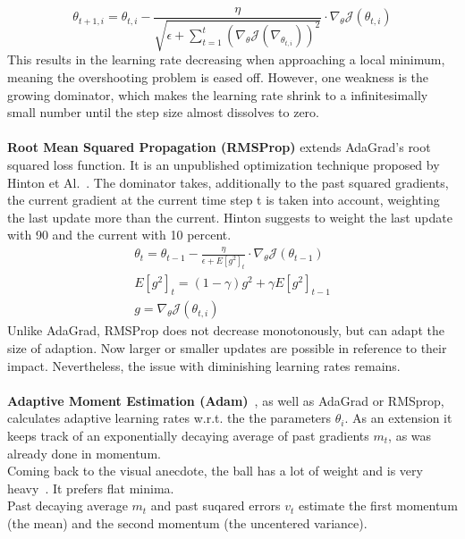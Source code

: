 \begin{equation}
    \theta_{t+1,i} = \theta_{t,i} - \frac{\eta}{\sqrt{\epsilon+\sum_{t=1}^{t}(\nabla_\theta\mathcal{J}(\nabla_{\theta_{t,i}}))^2}} \cdot \nabla_\theta\mathcal{J}(\theta_{t,i})
    \label{eqn:adagrad}
\end{equation}
This results in the learning rate decreasing when approaching a local minimum, meaning the overshooting problem is eased off.
However, one weakness is the growing dominator, which makes the learning rate shrink to a infinitesimally small number until the step
size almost dissolves to zero.
\\\mbox{}\\
\textbf{Root Mean Squared Propagation (RMSProp)} extends AdaGrad's root squared loss function.
It is an unpublished optimization technique proposed by Hinton et Al.~\cite{rmsprop}.
The dominator takes, additionally to the past squared gradients, the current gradient at the current time step t is
taken into account, weighting the last update more than the current.
Hinton suggests to weight the last update with 90 and the current with 10 percent.
\begin{align}
    \theta_{t} = \theta_{t-1} - \frac{\eta}{\epsilon+E[g^2]_t} \cdot \nabla_\theta\mathcal{J}(\theta_{t-1})\label{eqn:rmsprop:1}\\
    E[g^2]_t = (1-\gamma)g^2+\gamma E[g^2]_{t-1}\label{eqn:rmsprop:2}\\
    g = \nabla_\theta\mathcal{J}(\theta_{t,i})\label{eqn:rmsprop:3}
\end{align}
Unlike AdaGrad, RMSProp does not decrease monotonously, but can adapt the size of adaption.
Now larger or smaller updates are possible in reference to their impact.
Nevertheless, the issue with diminishing learning rates remains.
\\\mbox{}\\
\textbf{Adaptive Moment Estimation (Adam)}~\cite{adam}, as well as AdaGrad or RMSprop, calculates adaptive learning rates w.r.t. the
the parameters $\theta_i$.
As an extension it keeps track of an exponentially decaying average of past gradients $m_t$, as was already done in
momentum.\\
Coming back to the visual anecdote, the ball has a lot of weight and is very heavy~\cite{optimizersoverview}.
It prefers flat minima.\\
Past decaying average $m_t$ and past suqared errors $v_t$ estimate the first momentum (the mean) and the second momentum
(the uncentered variance).

